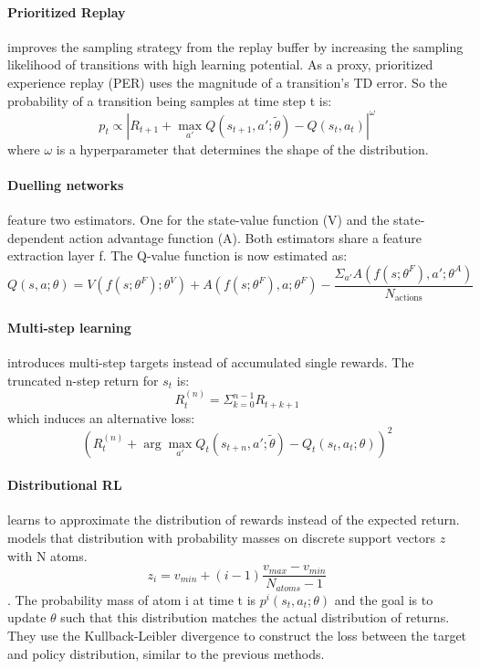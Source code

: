 \paragraph{Prioritized Replay} \cite{PER} improves the sampling strategy from the replay buffer by increasing the sampling likelihood of transitions with high learning potential.
As a proxy, prioritized experience replay (PER) uses the magnitude of a transition's TD error. So the probability of a transition being samples at time step t is:
$$p_t \propto | R_{t+1} + \max_{a'} Q(s_{t+1},a';\tilde\theta) - Q(s_t,a_t)|^\omega $$
where $\omega$ is a hyperparameter that determines the shape of the distribution.

\paragraph{Duelling networks} \cite{dueling} feature two estimators. One for the state-value function (V) and the state-dependent action advantage function (A).
Both estimators share a feature extraction layer f. The Q-value function is now estimated as:
$$Q(s,a;\theta) = V(f(s;\theta^F);\theta^V) + A(f(s;\theta^F), a;\theta^F) - \dfrac{\Sigma_{a'}A(f(s;\theta^F), a';\theta^A)}{N_\text{actions}} $$

\paragraph{Multi-step learning} introduces multi-step targets instead of accumulated single rewards.
The truncated n-step return for $s_t$ is:
$$R_t^{(n)}=\Sigma_{k=0}^{n-1} R_{t+k+1} $$
which induces an alternative loss:
$$(R_t^{(n)} + \arg\max_{a'}Q_t(s_{t+n},a';\tilde\theta)  - Q_t(s_t,a_t;\theta))^2$$

\paragraph{Distributional RL} learns to approximate the distribution of rewards instead of the expected return. \cite{distributionalRL} models that distribution with probability masses on discrete support vectors $z$ with N atoms.
$$z_i = v_{min} + (i-1)\dfrac{v_{max}-v_{min}}{N_{atoms}-1} $$.
The probability mass of atom i at time t is $p^i(s_t, a_t; \theta)$ and the goal is to update $\theta$ such that this distribution matches the actual distribution of returns.
They use the Kullback-Leibler divergence to construct the loss between the target and policy distribution, similar to the previous methods.

